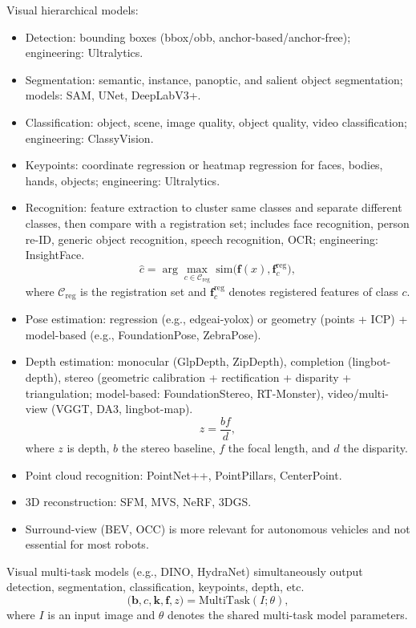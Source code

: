 \documentclass[12pt,a4paper]{article}
\begin{document}
Visual hierarchical models:
\begin{itemize}
\item Detection: bounding boxes (bbox/obb, anchor-based/anchor-free); engineering: Ultralytics.
\item Segmentation: semantic, instance, panoptic, and salient object segmentation; models: SAM, UNet, DeepLabV3+.
\item Classification: object, scene, image quality, object quality, video classification; engineering: ClassyVision.
\item Keypoints: coordinate regression or heatmap regression for faces, bodies, hands, objects; engineering: Ultralytics.
\item Recognition: feature extraction to cluster same classes and separate different classes, then compare with a registration set; includes face recognition, person re-ID, generic object recognition, speech recognition, OCR; engineering: InsightFace.
\begin{equation}
\hat{c}=\arg\max_{c\in\mathcal{C}_{\mathrm{reg}}}\ \mathrm{sim}\bigl(\mathbf{f}(x),\mathbf{f}_{c}^{\mathrm{reg}}\bigr),
\label{eq:recognition-feature}
\end{equation}
where $\mathcal{C}_{\mathrm{reg}}$ is the registration set and $\mathbf{f}_{c}^{\mathrm{reg}}$ denotes registered features of class $c$.
\item Pose estimation: regression (e.g., edgeai-yolox) or geometry (points + ICP) + model-based (e.g., FoundationPose, ZebraPose).
\item Depth estimation: monocular (GlpDepth, ZipDepth), completion (lingbot-depth), stereo (geometric calibration + rectification + disparity + triangulation; model-based: FoundationStereo, RT-Monster), video/multi-view (VGGT, DA3, lingbot-map).
\begin{equation}
z=\frac{bf}{d},
\label{eq:depth-stereo}
\end{equation}
where $z$ is depth, $b$ the stereo baseline, $f$ the focal length, and $d$ the disparity.
\item Point cloud recognition: PointNet++, PointPillars, CenterPoint.
\item 3D reconstruction: SFM, MVS, NeRF, 3DGS.
\item Surround-view (BEV, OCC) is more relevant for autonomous vehicles and not essential for most robots.
\end{itemize}

Visual multi-task models (e.g., DINO, HydraNet) simultaneously output detection, segmentation, classification, keypoints, depth, etc.
\begin{equation}
\bigl(\mathbf{b},c,\mathbf{k},\mathbf{f},z\bigr)=\mathrm{MultiTask}(I;\theta),
\label{eq:multi-task}
\end{equation}
where $I$ is an input image and $\theta$ denotes the shared multi-task model parameters.
\end{document}
